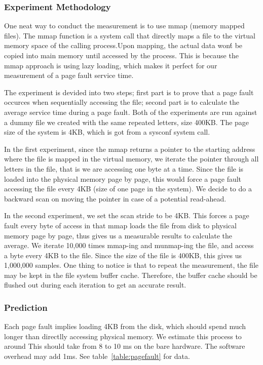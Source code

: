 \documentclass{article} %
\begin{document}
\subsubsection{Experiment Methodology}
One neat way to conduct the measurement is to use mmap (memory mapped files). The mmap function is a system call that directly maps a file to the virtual memory space of the calling process.Upon mapping, the actual data won\'t be copied into main memory until accessed by the process. This is because the mmap approach is using lazy loading, which makes it perfect for our measurement of a page fault service time.

The experiment is devided into two steps; first part is to prove that a page
fault occurces when sequentially accessing the file; second part is to
calculate the average service time during a page fault.  Both of the
experiments are run against a dummy file we created with the same repeated
letters, size 400KB\@. The page size of the system is 4KB, which is got from a
sysconf system call.

In the first experiment, since the mmap returns a pointer to the starting address where the file is mapped in the virtual memory, we iterate the pointer through all letters in the file, that is we are accessing one byte at a time. Since the file is loaded into the physical memory page by page, this would force a page fault accessing the file every 4KB (size of one page in the system). We decide to do a backward scan on moving the pointer in case of a potential read-ahead.

In the second experiment, we set the scan stride to be 4KB\@. This forces a page
fault every byte of access in that mmap loads the file from disk to physical
memory page by page, thus gives us a measurable results to calculate the
average.
We iterate 10,000 times mmap-ing and munmap-ing the file, and access a byte every 4KB to the file. Since the size of the file is 400KB, this gives us 1,000,000 samples.
One thing to notice is that to repeat the measurement,  the file may be kept in the file system buffer cache. Therefore, the buffer cache should be flushed out during each iteration to get an accurate result.

\subsubsection{Prediction}
Each page fault implies loading 4KB from the disk, which should spend much longer than directlly accessing physical memory. We estimate this process to around This should take from 8 to 10 ms on the bare hardware. The software overhead may add 1ms.
See table~\ref{table:pagefault} for data.
\end{document}
